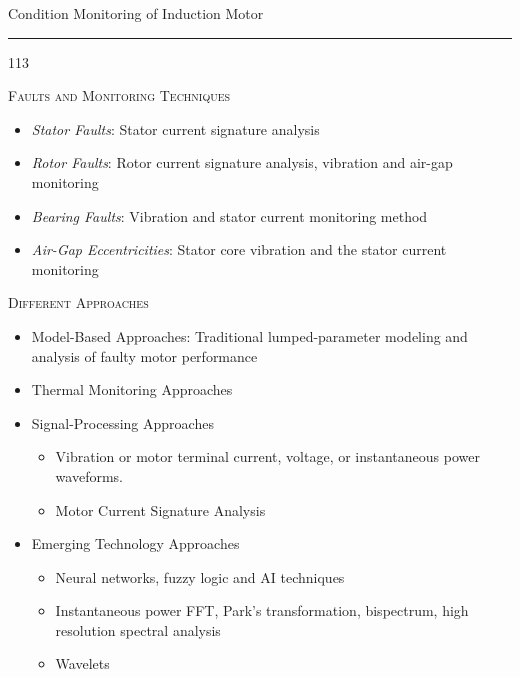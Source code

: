 \documentclass[a4,portrait,slidesonly]{seminar}
\begin{document}
\begin{slide*}
{\large \textsf{Condition Monitoring of Induction Motor}}\\
\hrule
\vspace{10pt}
\begin{dinglist} {113}
\item \textsc{Faults and Monitoring Techniques}
    \begin{itemize}
    \item \emph{Stator Faults}: Stator current signature analysis
    \item \emph{Rotor Faults}: Rotor current signature analysis, vibration and air-gap monitoring
    \item \emph{Bearing Faults}: Vibration and stator current monitoring method
    \item \emph{Air-Gap  Eccentricities}: Stator core vibration and the stator current monitoring
    \end{itemize}
\item \textsc{Different Approaches}
    \begin{itemize}
    \item Model-Based Approaches: Traditional lumped-parameter modeling and analysis of faulty motor performance
    \item Thermal Monitoring Approaches
    \item Signal-Processing Approaches
            \begin{itemize}
            \item Vibration or motor terminal current, voltage, or instantaneous power waveforms.
            \item Motor  Current  Signature  Analysis
            \end{itemize}
    \item Emerging Technology Approaches
            \begin{itemize}
            \item Neural networks, fuzzy logic and AI techniques
            \item Instantaneous power FFT, Park's transformation, bispectrum, high resolution spectral analysis
            \item Wavelets
            \end{itemize}
    \end{itemize}
\end{dinglist}
\end{slide*}
\end{document}
